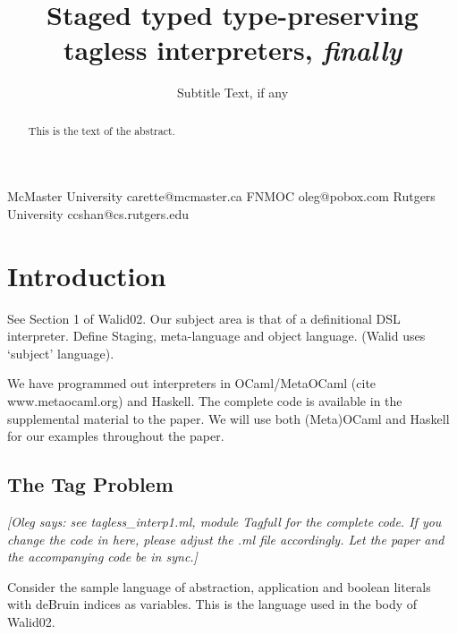 \documentclass[preprint]{sigplanconf}
\newcommand{\oleg}[1]{{\it [Oleg says: #1]}}
\begin{document}
\copyrightdata{[to be supplied]} 


\title{Staged typed type-preserving tagless interpreters, \emph{finally}}
\subtitle{Subtitle Text, if any}

           {McMaster University}
           {carette@mcmaster.ca}
           {FNMOC}
           {oleg@pobox.com}
           {Rutgers University}
           {ccshan@cs.rutgers.edu}

\maketitle

\begin{abstract}
This is the text of the abstract.
\end{abstract}


\section{Introduction}

See Section 1 of Walid02. Our subject area is that of a definitional DSL
interpreter.
Define Staging, meta-language and object language. (Walid uses
`subject' language).

We have programmed out interpreters in OCaml/MetaOCaml (cite
www.metaocaml.org) and Haskell. The complete code is available 
in the supplemental material to the paper. We will use both
(Meta)OCaml and Haskell for our examples throughout the paper.


\subsection{The Tag Problem}

\oleg{see tagless\_interp1.ml, module Tagfull for the complete code.
If you change the code in here, please adjust the .ml file
accordingly. Let the paper and the accompanying code be in sync.}


Consider the sample language of abstraction, application and boolean
literals with deBruin indices as variables. This is the language used
in the body of Walid02.
\end{document}
